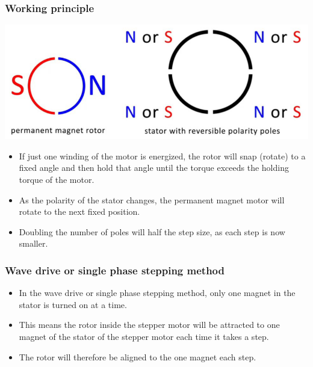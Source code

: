 \documentclass[11pt]{article}
\begin{document}
 \newpage
\subsubsection{Working principle}
\label{sec:org79047b7}
\begin{center}
\includegraphics[width=.9\linewidth]{./images/stepper-motor-working-principle-diagram.png}
\end{center}
\begin{itemize}
\item If just one winding of the motor is energized, the rotor will snap (rotate) to a fixed angle and then hold that angle until the torque exceeds the holding torque of the motor.
\item As the polarity of the stator changes, the permanent magnet motor will rotate to the next fixed position.
\item Doubling the number of poles will half the step size, as each step is now smaller.
\end{itemize}
\subsubsection{Wave drive or single phase stepping method}
\label{sec:org5241eb5}
\begin{itemize}
\item In the wave drive or single phase stepping method, only one magnet in the stator is turned on at a time.
\item This means the rotor inside the stepper motor will be attracted to one magnet of the stator of the stepper motor each time it takes a step.
\item The rotor will therefore be aligned to the one magnet each step.
\end{itemize}

 \newpage
\end{document}
